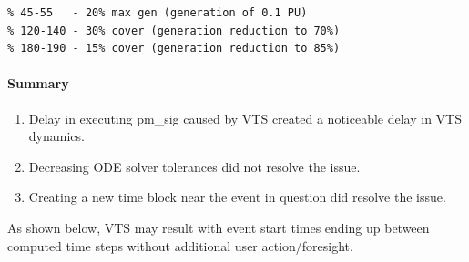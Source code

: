 \documentclass[12pt]{article}
\begin{document}
\begin{center}
\begin{minipage}{.47\linewidth}
\begin{itemize}
\begin{Verbatim}[fontsize=\scriptsize]
% cloud cover events
% 45-55   - 20% max gen (generation of 0.1 PU)
% 120-140 - 30% cover (generation reduction to 70%)
% 180-190 - 15% cover (generation reduction to 85%)
\end{Verbatim}
\end{itemize}
\end{minipage}

\end{center}

\paragraph{Summary} 
\begin{enumerate}
\item Delay in executing pm\_sig caused by VTS created a noticeable delay in VTS dynamics.
\item Decreasing ODE solver tolerances did not resolve the issue.
\item Creating a new time block near the event in question did resolve the issue.
\end{enumerate}
As shown below, VTS may result with event start times ending up between computed time steps without additional user action/foresight.\\
\end{document}
